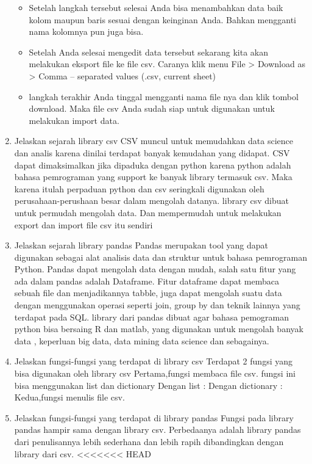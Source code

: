 \begin{enumerate}
\begin{itemize}
	\item Setelah langkah tersebut selesai Anda bisa menambahkan data baik kolom maupun baris sesuai dengan keinginan Anda. Bahkan mengganti nama kolomnya pun juga bisa.
	\item Setelah Anda selesai mengedit data tersebut sekarang kita akan melakukan eksport file ke file csv. Caranya klik menu File > Download as > Comma – separated values (.csv, current sheet)
	\item langkah terakhir Anda tinggal mengganti nama file nya dan klik tombol download. Maka file csv Anda sudah siap untuk digunakan untuk melakukan import data.
	\end{itemize}
    \item Jelaskan sejarah library csv
      CSV muncul untuk memudahkan data science dan analis karena dinilai terdapat banyak kemudahan yang didapat. CSV dapat dimaksimalkan jika dipaduka dengan python karena python adalah bahasa pemrograman yang support ke banyak library termasuk csv. Maka karena itulah 	perpaduan python dan csv seringkali digunakan oleh perusahaan-perushaan besar dalam mengolah datanya. library csv dibuat untuk permudah mengolah data. Dan mempermudah untuk melakukan export dan import file csv itu sendiri
    \item Jelaskan sejarah library pandas
    Pandas merupakan tool yang dapat digunakan sebagai alat analisis data dan struktur untuk bahasa pemrograman Python. Pandas dapat mengolah data dengan mudah, salah satu fitur yang ada dalam pandas adalah Dataframe. Fitur dataframe dapat membaca sebuah file dan menjadikannya tabble, juga dapat mengolah suatu data dengan menggunakan operasi seperti join, group by dan teknik lainnya yang terdapat pada SQL.  library dari pandas dibuat agar bahasa pemograman python bisa bersaing R dan matlab, yang digunakan untuk mengolah banyak data , keperluan big data, data mining data science dan sebagainya.
    \item Jelaskan fungsi-fungsi yang terdapat di library csv
    Terdapat 2 fungsi yang bisa digunakan oleh library csv
    Pertama,fungsi membaca file csv.
    fungsi ini bisa menggunakan list dan dictionary
    Dengan list :
    Dengan dictionary :
    Kedua,fungsi menulis file csv.
    \item Jelaskan fungsi-fungsi yang terdapat di library pandas
    Fungsi pada library pandas  hampir sama dengan library csv. Perbedaanya adalah library pandas dari penulisannya lebih sederhana dan lebih rapih dibandingkan dengan library dari csv.
<<<<<<< HEAD
\end{enumerate}

